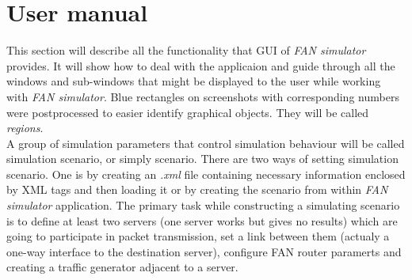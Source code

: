\documentclass[a4paper,12pt]{article}
\begin{document}
	\section{User manual}
	This section will describe all the functionality that GUI of \emph{FAN
	simulator} provides. It will show how to deal with the applicaion and guide
	through all the windows and sub-windows that might be displayed to the user
	while working with \emph{FAN simulator}.
	Blue rectangles on screenshots with corresponding numbers were postprocessed
	to easier identify graphical objects. They will be called \emph{regions}.\\	
	A group of simulation parameters that control simulation behaviour will be
	called simulation scenario, or simply scenario. There are two ways of setting
	simulation scenario. One is by creating an \emph{.xml} file containing
	necessary information enclosed by XML tags and then loading it or by creating
	the scenario from within \emph{FAN simulator} application. 
	The primary task while constructing a simulating scenario is to define at
	least two servers (one server works but gives no results) which are
	going to participate in packet transmission, set a link between them (actualy
	a one-way interface to the destination server), configure FAN router paramerts
	and creating a traffic generator adjacent to a server.
	
\end{document}
